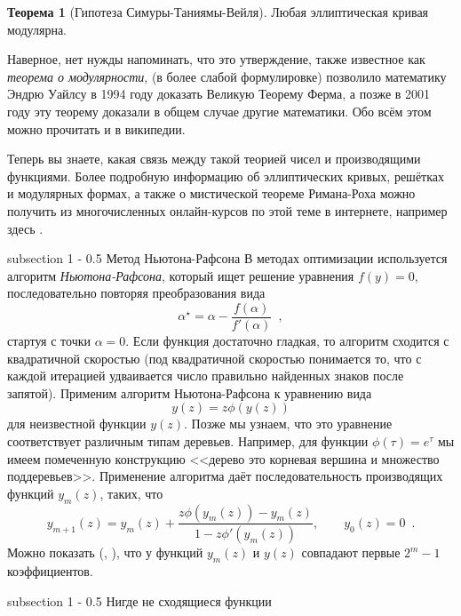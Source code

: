 \documentclass[a5paper]{article}
\makeatletter
\theoremstyle{definition}
\newtheorem*{theorem}{Теорема}
\renewcommand{\subsection}{\@startsection
{subsection}%
{1}%
{\z@}%
{-\baselineskip}%
{0.5\baselineskip}%
{\centering\large\scshape}} %
\makeatother
\begin{document}
\begin{theorem}[Гипотеза Симуры-Таниямы-Вейля]
Любая эллиптическая кривая модулярна.
\end{theorem}
Наверное, нет нужды напоминать, что это утверждение, также известное как \textit{теорема о модулярности}, (в более слабой формулировке) позволило математику Эндрю Уайлсу в 1994 году доказать Великую Теорему Ферма, а позже в 2001 году эту теорему доказали в общем случае другие математики. Обо всём этом можно прочитать и в википедии.

Теперь вы знаете, какая связь между такой теорией чисел и производящими функциями. Более подробную информацию об эллиптических кривых, решётках и модулярных формах, а также о мистической теореме Римана-Роха можно получить из многочисленных онлайн-курсов по этой теме в интернете, например здесь \cite{MF}.

\subsection{Метод Ньютона-Рафсона}
В методах оптимизации используется алгоритм \textit{Ньютона-Рафсона}, который 
ищет решение уравнения \( f(y) = 0 \), последовательно повторяя преобразования 
вида
\[
	\alpha^{\star} = \alpha - \dfrac{f(\alpha)}{f'(\alpha)} \enspace,
\]
стартуя с точки \( \alpha = 0 \). Если функция достаточно гладкая, то алгоритм 
сходится с квадратичной скоростью (под квадратичной скоростью понимается то, что с каждой итерацией удваивается число правильно найденных знаков после запятой). Применим алгоритм Ньютона-Рафсона к 
уравнению вида
\[
	y(z) = z \phi(y(z))
\]
для неизвестной функции \( y(z) \). Позже мы узнаем, что это уравнение 
соответствует различным типам деревьев. Например, для функции \( \phi(\tau) = 
e^{\tau} \) мы имеем помеченную конструкцию <<дерево это корневая вершина и 
множество поддеревьев>>. Применение алгоритма даёт последовательность 
производящих функций \(  y_{m}(z) \), таких, что
\[
	y_{m+1}(z) = y_{m}(z) + \dfrac{z \phi(y_{m}(z)) - y_{m}(z)}{1 - z 
	\phi'(y_m(z))}, \qquad y_0(z) = 0 \enspace .
\]
Можно показать (\cite[I.64, p.88]{ac}, \cite[Section 3.3]{species}), что у функций \( y_{m}(z) \) и \( y(z) 
\) совпадают первые \( 2^m - 1 \) коэффициентов.

\subsection{Нигде не сходящиеся функции}
\end{document}
